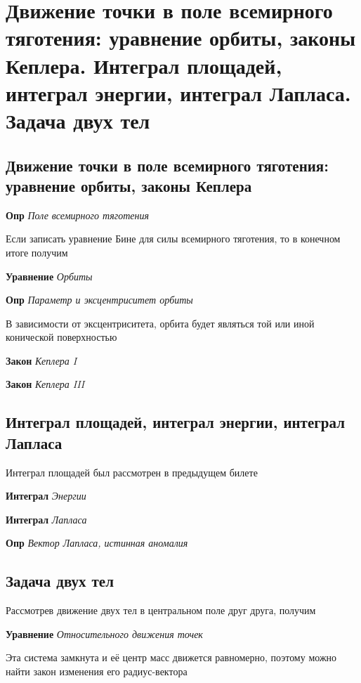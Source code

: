 \documentclass[a4paper, 14pt]{article}
\begin{document}
    \section{Движение точки в поле всемирного тяготения: уравнение орбиты, законы Кеплера.
    Интеграл площадей, интеграл энергии, интеграл Лапласа.
    Задача двух тел}
    
    \subsection{Движение точки в поле всемирного тяготения: уравнение орбиты, законы Кеплера}
    
    \textbf{Опр} \textit{Поле всемирного тяготения}
    
    Если записать уравнение Бине для силы всемирного тяготения, то в конечном итоге получим
    
    \textbf{Уравнение} \textit{Орбиты}
    
    \textbf{Опр} \textit{Параметр и эксцентриситет орбиты}
    
    В зависимости от эксцентриситета, орбита будет являться той или иной конической поверхностью
    
    \textbf{Закон} \textit{Кеплера I}
    
    \textbf{Закон} \textit{Кеплера III}
    
    \subsection{Интеграл площадей, интеграл энергии, интеграл Лапласа}
    
    Интеграл площадей был рассмотрен в предыдущем билете
    
    \textbf{Интеграл} \textit{Энергии}
    
    \textbf{Интеграл} \textit{Лапласа}
    
    \textbf{Опр} \textit{Вектор Лапласа, истинная аномалия}
    
    \subsection{Задача двух тел}
    
    Рассмотрев движение двух тел в центральном поле друг друга, получим
    
    \textbf{Уравнение} \textit{Относительного движения точек}
    
    Эта система замкнута и её центр масс движется равномерно, поэтому можно найти закон изменения его радиус-вектора
    
\end{document}

